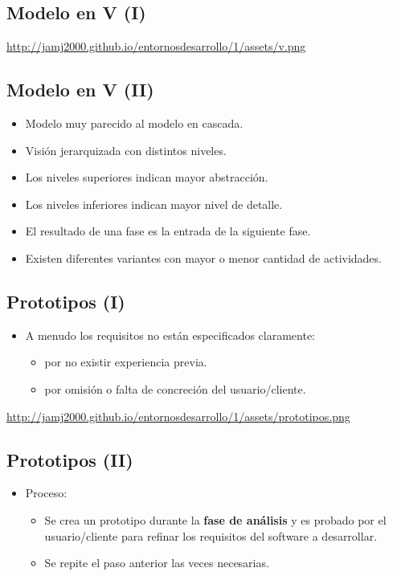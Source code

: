 \documentclass[a4paper]{article}
\begin{document}
\subsection{Modelo en V (I)}
\label{modelo-en-v-i}
\url{http://jamj2000.github.io/entornosdesarrollo/1/assets/v.png}
\subsection{Modelo en V (II)}
\label{modelo-en-v-ii}
\begin{itemize}
\item Modelo muy parecido al modelo en cascada.
\item Visión jerarquizada con distintos niveles.
\item Los niveles superiores indican mayor abstracción.
\item Los niveles inferiores indican mayor nivel de detalle.
\item El resultado de una fase es la entrada de la siguiente fase.
\item Existen diferentes variantes con mayor o menor cantidad de
actividades.
\end{itemize}
\subsection{Prototipos (I)}
\label{prototipos-i}
\begin{itemize}
\item A menudo los requisitos no están especificados claramente:
\begin{itemize}
\item por no existir experiencia previa.
\item por omisión o falta de concreción del usuario/cliente.
\end{itemize}
\end{itemize}

\url{http://jamj2000.github.io/entornosdesarrollo/1/assets/prototipos.png}
\subsection{Prototipos (II)}
\label{prototipos-ii}
\begin{itemize}
\item Proceso:
\begin{itemize}
\item Se crea un prototipo durante la \textbf{fase de análisis} y es probado por
el usuario/cliente para refinar los requisitos del software a
desarrollar.
\item Se repite el paso anterior las veces necesarias.
\end{itemize}
\end{itemize}
\end{document}
